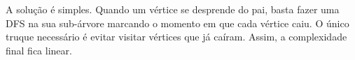 A solução é simples. Quando um vértice se desprende do pai, basta fazer uma DFS na sua sub-árvore marcando
o momento em que cada vértice caiu. O único truque necessário é evitar visitar vértices que já caíram.
Assim, a complexidade final fica linear.
